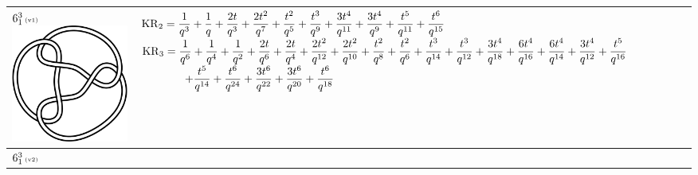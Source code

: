 \documentclass{compositio}
\theoremstyle{definition}
\numberwithin{equation}{section}
\begin{document}
{\begin{longtable}{p{}|p{}}
\\
\hline
$6_{1}^3\,\text{{\tiny (v1)}}$ 
\includegraphics[scale=0.07,angle=0]{link6_1_3.pdf} 
& 
\newline 
$
\displaystyle{%
\KR_{2} = \frac{1}{q^3}+\frac{1}{q}+\frac{2 t}{q^3}+\frac{2 t^2}{q^7}+\frac{t^2}{q^5}+\frac{t^3}{q^9}+\frac{3 t^4}{q^{11}}+\frac{3 t^4}{q^9}+\frac{t^5}{q^{11}}+\frac{t^6}{q^{15}}
}
$
\newline 
$
\displaystyle{%
\KR_{3} = \frac{1}{q^6}+\frac{1}{q^4}+\frac{1}{q^2}+\frac{2 t}{q^6}+\frac{2 t}{q^4}+\frac{2 t^2}{q^{12}}+\frac{2 t^2}{q^{10}}+\frac{t^2}{q^8}+\frac{t^2}{q^6}+\frac{t^3}{q^{14}}+\frac{t^3}{q^{12}}+\frac{3 t^4}{q^{18}}+\frac{6 t^4}{q^{16}}+\frac{6 t^4}{q^{14}}+\frac{3 t^4}{q^{12}}+\frac{t^5}{q^{16}}
}
$
\newline
$
\displaystyle{%
\qquad\qquad +\frac{t^5}{q^{14}}+\frac{t^6}{q^{24}}+\frac{3 t^6}{q^{22}}+\frac{3 t^6}{q^{20}}+\frac{t^6}{q^{18}}
}
$
\newline 
\\
\hline
$6_{1}^3\,\text{{\tiny (v2)}}$ 

\end{longtable}}
\end{document}
